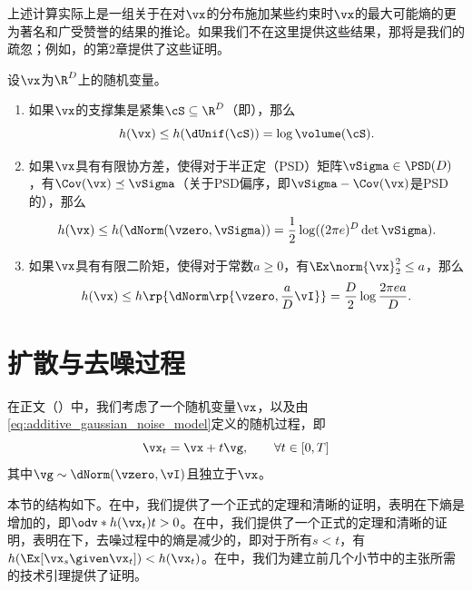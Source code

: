 \documentclass[../../book-main_zh.tex]{subfiles}
\begin{document}
上述计算实际上是一组关于在对\(\vx\)的分布施加某些约束时\(\vx\)的最大可能熵的更为著名和广受赞誉的结果的推论。如果我们不在这里提供这些结果，那将是我们的疏忽；例如，\cite{poliyanski2024information}的第2章提供了这些证明。
\begin{theorem}\label{thm:max_entropy}
    设\(\vx\)为\(\R^{D}\)上的随机变量。
    \begin{enumerate}
        \item 如果\(\vx\)的支撑集是紧集\(\cS \subseteq \R^{D}\)（即），那么
            \begin{equation}
                h(\vx) \leq h(\dUnif(\cS)) = \log \volume(\cS).
            \end{equation}
        \item 如果\(\vx\)具有有限协方差，使得对于半正定（PSD）矩阵\(\vSigma \in \PSD(D)\)，有\(\Cov(\vx) \preceq \vSigma\)（关于PSD偏序，即\(\vSigma - \Cov(\vx)\)是PSD的），那么
            \begin{equation}
                h(\vx) \leq h(\dNorm(\vzero, \vSigma)) =
                \frac{1}{2}\log((2\pi e)^{D}\det\vSigma).
            \end{equation}
        \item 如果\(\vx\)具有有限二阶矩，使得对于常数\(a \geq 0\)，有\(\Ex\norm{\vx}_{2}^{2} \leq a\)，那么
            \begin{equation}
                h(\vx) \leq h\rp{\dNorm\rp{\vzero, \frac{a}{D}\vI}} =
                \frac{D}{2}\log\frac{2\pi e a}{D}.
            \end{equation}
    \end{enumerate}
\end{theorem}

\section{扩散与去噪过程}\label{sec:entropy_diffusion}

在正文（）中，我们考虑了一个随机变量\(\vx\)，以及由\eqref{eq:additive_gaussian_noise_model}定义的随机过程，即
\begin{equation}\label{eq:app_additive_gaussian_noise_model}
    \vx_{t} = \vx + t\vg, \qquad  \forall t \in [0, T]
\end{equation}
其中\(\vg \sim \dNorm(\vzero, \vI)\)且独立于\(\vx\)。

本节的结构如下。在中，我们提供了一个正式的定理和清晰的证明，表明在下熵是增加的，即\(\odv*{h(\vx_{t})}{t} > 0\)。在中，我们提供了一个正式的定理和清晰的证明，表明在下，去噪过程中的熵是减少的，即对于所有\(s < t\)，有\(h(\Ex[\vx_{s} \given \vx_{t}]) < h(\vx_{t})\)。在中，我们为建立前几个小节中的主张所需的技术引理提供了证明。
\end{document}
